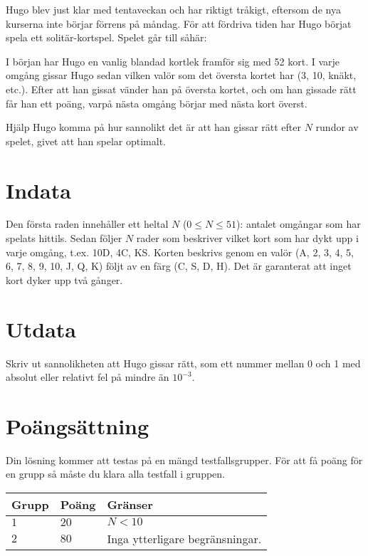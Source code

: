 Hugo blev just klar med tentaveckan och har riktigt tråkigt, eftersom de nya kurserna inte börjar förrens på måndag.
För att fördriva tiden har Hugo börjat spela ett solitär-kortspel. Spelet går till såhär:

I början har Hugo en vanlig blandad kortlek framför sig med 52 kort. I varje omgång gissar Hugo sedan vilken valör som det översta kortet har (3, 10, knäkt, etc.).
Efter att han gissat vänder han på översta kortet, och om han gissade rätt får han ett poäng, varpå nästa omgång börjar med nästa kort överst.

Hjälp Hugo komma på hur sannolikt det är att han gissar rätt efter $N$ rundor av spelet, givet att han spelar optimalt.

\section*{Indata}
Den första raden innehåller ett heltal $N$ ($0 \le N \le 51$): antalet omgångar som har spelats hittils.
Sedan följer $N$ rader som beskriver vilket kort som har dykt upp i varje omgång, t.ex. 10D, 4C, KS.
Korten beskrivs genom en valör (A, 2, 3, 4, 5, 6, 7, 8, 9, 10, J, Q, K) följt av en färg (C, S, D, H).
Det är garanterat att inget kort dyker upp två gånger.

\section*{Utdata}
Skriv ut sannolikheten att Hugo gissar rätt, som ett nummer mellan 0 och 1 med absolut eller relativt fel på mindre än $10^{-3}$.

\section*{Poängsättning}
Din lösning kommer att testas på en mängd testfallsgrupper.
För att få poäng för en grupp så måste du klara alla testfall i gruppen.

\noindent
\begin{tabular}{| l | l | p{12cm} |}
  \hline
  \textbf{Grupp} & \textbf{Poäng} & \textbf{Gränser} \\ \hline
  $1$    & $20$       & $N < 10$ \\ \hline
  $2$    & $80$       & Inga ytterligare begränsningar. \\ \hline
\end{tabular}
